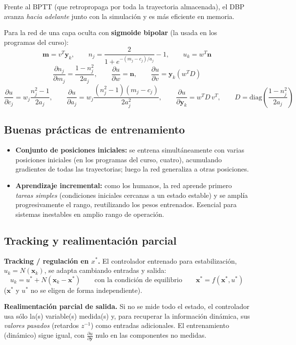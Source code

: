 \documentclass[11pt,a4paper]{article}
\newcommand{\pd}[2]{\frac{\partial #1}{\partial #2}}
\begin{document}
Frente al BPTT (que retropropaga por toda la trayectoria almacenada), el DBP avanza \emph{hacia adelante} junto con la simulación y es más eficiente en memoria.

Para la red de una capa oculta con \textbf{sigmoide bipolar} (la usada en los programas del curso):
\[
\mathbf m=v^{T}\mathbf y_k,\qquad
n_j=\frac{2}{1+e^{-(m_j-c_j)/a_j}}-1,\qquad
u_k=w^{T}\mathbf n
\]
\[
\pd{n_j}{m_j}=\frac{1-n_j^2}{2a_j},\qquad
\pd{u}{w}=\mathbf n,\qquad
\pd{u}{v}=\mathbf y_k(w^{T}D)
\]
\[
\pd{u}{c_j}=w_j\frac{n_j^2-1}{2a_j},\qquad
\pd{u}{a_j}=w_j\frac{(n_j^2-1)(m_j-c_j)}{2a_j^2},\qquad
\pd{u}{\mathbf y_k}=w^{T}D\,v^{T},\qquad D=\mathrm{diag}\!\left(\frac{1-n_j^2}{2a_j}\right)
\]

\subsection{Buenas prácticas de entrenamiento}

\begin{itemize}[itemsep=1pt]
\item \textbf{Conjunto de posiciones iniciales:} se entrena simultáneamente con varias posiciones iniciales (en los programas del curso, cuatro), acumulando gradientes de todas las trayectorias; luego la red generaliza a otras posiciones.
\item \textbf{Aprendizaje incremental:} como los humanos, la red aprende primero \emph{tareas simples} (condiciones iniciales cercanas a un estado estable) y se amplía progresivamente el rango, reutilizando los pesos entrenados. Esencial para sistemas inestables en amplio rango de operación.
\end{itemize}

\subsection{Tracking y realimentación parcial}

\textbf{Tracking / regulación en $x^{*}$.} El controlador entrenado para estabilización, $u_k=N(\mathbf x_k)$, se adapta cambiando entradas y salida:
\[
\boxed{u_k=u^{*}+N(\mathbf x_k-\mathbf x^{*})}
\qquad\text{con la condición de equilibrio}\qquad
\boxed{\mathbf x^{*}=f(\mathbf x^{*},u^{*})}
\]
($\mathbf x^{*}$ y $u^{*}$ no se eligen de forma independiente).

\textbf{Realimentación parcial de salida.} Si no se mide todo el estado, el controlador usa sólo la(s) variable(s) medida(s) y, para recuperar la información dinámica, sus \emph{valores pasados} (retardos $z^{-1}$) como entradas adicionales. El entrenamiento (dinámico) sigue igual, con $\pd{u}{\mathbf y}$ nulo en las componentes no medidas.
\end{document}
